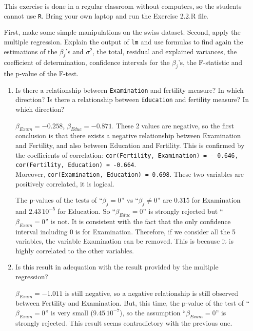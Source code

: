 \documentclass[12pt]{article}
\newcommand \noi \noindent
\def\vs1{\vspace{1mm}}
\def\v3{\vspace{3mm}}
\begin{document}
\v3

\noi {\it Indications.} This exercise is done in a regular classroom without computers, so the students cannot use {\tt R}. Bring your own laptop and run the Exercise 2.2.R file.

First, make some simple manipulations on the swiss dataset. Second, apply the multiple regression. Explain the output of {\tt lm} and use formulas to find again the estimations of the $\beta_j$'s and $\sigma^2$, the total, residual and explained variances, the coefficient of determination, confidence intervals for the $\beta_j$'s, the F-statistic and the p-value of the F-test.

\begin{enumerate}

\item Is there a relationship between \texttt{Examination} and  fertility measure? In which direction?
Is there a relationship between \texttt{Education} and  fertility measure? In which direction?

\v3

$\beta_{Exam} = -0.258$, $\beta_{Educ} = -0.871$. These 2 values are negative, so the first conclusion is that there exists a negative relationship between Examination and Fertility, and also between Education and Fertility. This is confirmed by the coefficients of correlation: {\tt cor(Fertility, Examination) = - 0.646, cor(Fertility, Education) = -0.664}.\\
Moreover, {\tt cor(Examination, Education) = 0.698}. These two variables are positively correlated, it is logical.

\vs1 

The p-values of the tests of ``$\beta_j = 0$'' vs ``$\beta_j \neq 0$'' are 0.315 for Examination and $2.43 \, 10^{-5}$ for Education. So ``$\beta_{Educ} = 0$'' is strongly rejected but ``$\beta_{Exam} = 0$'' is not. It is consistent with the fact that the only confidence interval including 0 is for Examination. Therefore, if we consider all the 5 variables, the variable Examination can be removed. This is because it is highly correlated to the other variables.

\v3

\item Is this result in adequation with the result provided by the multiple regression?

\v3

$\beta_{Exam} = -1.011$ is still negative, so a negative relationship is still observed between Fertility and Examination. But, this time, the p-value of the test of ``$\beta_{Exam} = 0$'' is very small ($9.45 \, 10^{-7}$), so the assumption ``$\beta_{Exam} = 0$'' is strongly rejected. This result seems contradictory with the previous one.


\end{enumerate}
\end{document}
